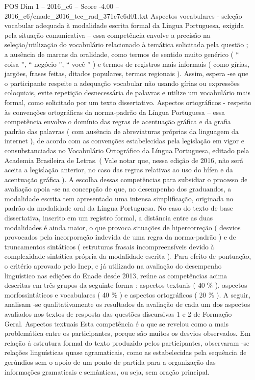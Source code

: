 \begin{textsample}{POS Dim 1 – 2016\_c6 – Score -4.00 – 2016\_c6/enade\_2016\_tec\_rad\_371c7e6d01.txt}
Aspectos vocabulares - seleção vocabular adequada à modalidade escrita formal da Língua Portuguesa, exigida pela situação comunicativa – essa competência envolve a precisão na seleção/utilização do vocabulário relacionado à temática solicitada pela questão ; a ausência de marcas da oralidade, como termos de sentido muito genérico ( “ coisa ”, “ negócio ”, “ você ” ) e termos de registros mais informais ( como gírias, jargões, frases feitas, ditados populares, termos regionais ).
Assim, espera -se que o participante respeite a adequação vocabular não usando gírias ou expressões coloquiais, evite repetição desnecessária de palavras e utilize um vocabulário mais formal, como solicitado por um texto dissertativo.
Aspectos ortográficos - respeito às convenções ortográficas da norma-padrão da Língua Portuguesa – essa competência envolve o domínio das regras de acentuação gráfica e da grafia padrão das palavras ( com ausência de abreviaturas próprias da linguagem da internet ), de acordo com as convenções estabelecidas pela legislação em vigor e consubstanciadas no Vocabulário Ortográfico da Língua Portuguesa, editado pela Academia Brasileira de Letras. ( Vale notar que, nessa edição de 2016, não será aceita a legislação anterior, no caso das regras relativas ao uso do hífen e da acentuação gráfica ).
A escolha dessas competências para subsidiar o processo de avaliação apoia -se na concepção de que, no desempenho dos graduandos, a modalidade escrita tem apresentado uma intensa simplificação, originada no padrão da modalidade oral da Língua Portuguesa.
No caso do texto de base dissertativa, inscrito em um registro formal, a distância entre as duas modalidades é ainda maior, o que provoca situações de hipercorreção ( desvios provocados pela incorporação indevida de uma regra da norma-padrão ) e de truncamentos sintáticos ( estruturas frasais incompreensíveis devido à complexidade sintática própria da modalidade escrita ).
Para efeito de pontuação, o critério aprovado pelo Inep, e já utilizado na avaliação do desempenho linguístico nas edições do Enade desde 2013, reúne as competências acima descritas em três grupos da seguinte forma : aspectos textuais ( 40 \% ), aspectos morfossintáticos e vocabulares ( 40 \% ) e aspectos ortográficos ( 20 \% ).
A seguir, analisam -se qualitativamente os resultados da avaliação de cada um dos aspectos avaliados nos textos de resposta das questões discursivas 1 e 2 de Formação Geral.
Aspectos textuais Esta competência é a que se revelou como a mais problemática entre os participantes, porque são muitos os desvios observados.
Em relação à estrutura formal do texto produzido pelos participantes, observaram -se relações linguísticas quase agramaticais, como as estabelecidas pela sequência de gerúndios sem o apoio de um ponto de partida para a organização das informações gramaticais e semânticas, ou seja, sem oração principal.

\end{textsample}
